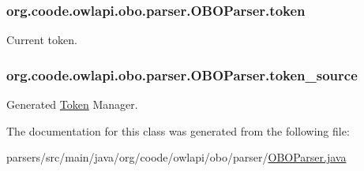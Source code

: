 \hypertarget{classorg_1_1coode_1_1owlapi_1_1obo_1_1parser_1_1_o_b_o_parser_a6898b30760c30032a7ba8e84ae4188d8}{
\subsubsection[{token}]{ org.\-coode.\-owlapi.\-obo.\-parser.\-O\-B\-O\-Parser.\-token}}\label{classorg_1_1coode_1_1owlapi_1_1obo_1_1parser_1_1_o_b_o_parser_a6898b30760c30032a7ba8e84ae4188d8}
Current token. \hypertarget{classorg_1_1coode_1_1owlapi_1_1obo_1_1parser_1_1_o_b_o_parser_a37e4504977c2e29f922fbb9116ca0184}{
\subsubsection[{token\-\_\-source}]{ org.\-coode.\-owlapi.\-obo.\-parser.\-O\-B\-O\-Parser.\-token\-\_\-source}}\label{classorg_1_1coode_1_1owlapi_1_1obo_1_1parser_1_1_o_b_o_parser_a37e4504977c2e29f922fbb9116ca0184}
Generated \hyperlink{classorg_1_1coode_1_1owlapi_1_1obo_1_1parser_1_1_token}{Token} Manager. 

The documentation for this class was generated from the following file\-:\begin{DoxyCompactItemize}
\item 
parsers/src/main/java/org/coode/owlapi/obo/parser/\hyperlink{_o_b_o_parser_8java}{O\-B\-O\-Parser.\-java}\end{DoxyCompactItemize}
